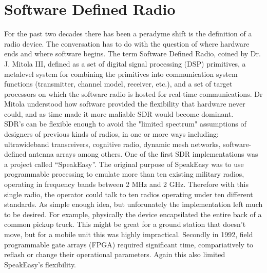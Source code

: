 \section{Software Defined Radio}

For the past two decades there has been a peradyme shift is the definition of a radio device.  The conversation has to do with the question of where hardware ends and where software begins.  The term Software Defined Radio, coined by Dr. J. Mitola III,  defined as a set of digital signal processing (DSP) primitives, a metalevel system for combining the primitives into communication system functions (transmitter, channel model, receiver, etc.), and a set of target processors on which the software radio is hosted for real-time communications\cite{21}.  Dr Mitola understood how software provided the flexibility that hardware never could, and as time made it more maliable SDR would become dominant.\\

SDR's can be flexible enough to avoid the "limited spectrum" assumptions of designers of previous kinds of radios, in one or more ways including: ultrawideband transceivers, cognitive radio, dynamic mesh networks, software-defined antenna arrays among others\cite{22}.  One of the first SDR implementations was a project called ``SpeakEasy''.  The original purpose of SpeakEasy was to use programmable processing to emulate more than ten existing military radios, operating in frequency bands between 2 MHz and 2 GHz\cite{23}.  Therefore with this single radio, the operator could talk to ten radios operating under ten different standards.  As simple enough idea, but unforunately the implementation left much to be desired.  For example, physically the device encapsilated the entire back of a common pickup truck\cite{23}.  This might be great for a ground station that doesn't move, but for a mobile unit this was highly impractical.  Secondly in 1992, field programmable gate arrays (FPGA) required significant time, compariatively to reflash or change their operational parameters.  Again this also limited SpeakEasy's flexibility.\\

